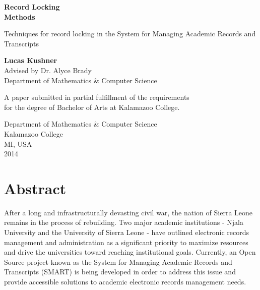 \documentclass[12pt]{article}
\begin{document}
\begin{titlepage}
    \begin{center}
        \vspace*{2.3cm}
        \Huge
        \textbf{Record Locking \\ Methods}

        \vspace{1cm}
        \Large
        Techniques for record locking in the System for Managing Academic Records and Transcripts

        \vspace{1.5cm}
        \normalsize
        \textbf{Lucas Kushner}\\
        Advised by Dr. Alyce Brady \\Department of Mathematics \& Computer Science

        \vfill
        A paper submitted in partial fulfillment of the requirements \\for the degree of Bachelor of Arts at Kalamazoo College.

        \vspace{0.8cm}
        Department of Mathematics \& Computer Science\\
        Kalamazoo College\\
        MI, USA\\
        2014
    \end{center}
    \thispagestyle{empty}
\end{titlepage}

\newpage\null\thispagestyle{empty}\newpage

\doublespace

\section*{Abstract}
After a long and infrastructurally devasting civil war, the nation of Sierra Leone remains in the process of rebuilding. Two major academic institutions - Njala University and the University of Sierra Leone - have outlined electronic records management and administration as a significant priority to maximize resources and drive the universities toward reaching institutional goals. Currently, an Open Source project known as the System for Managing Academic Records and Transcripts (SMART) is being developed in order to address this issue and provide accessible solutions to academic electronic records management needs.
\end{document}

